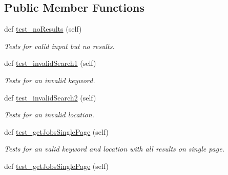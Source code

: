 \subsection*{Public Member Functions}
\begin{DoxyCompactItemize}
\item 
\mbox{\label{classtest_1_1indeedTest_a3d5826de5f0ba8570e2f9f8b31fd9a5a}} 
def \hyperlink{classtest_1_1indeedTest_a3d5826de5f0ba8570e2f9f8b31fd9a5a}{test\+\_\+no\+Results} (self)
\begin{DoxyCompactList}\small\item\em Tests for valid input but no results. \end{DoxyCompactList}\item 
\mbox{\label{classtest_1_1indeedTest_a42a1ea2430b1d5cd9d11a42a0ace4694}} 
def \hyperlink{classtest_1_1indeedTest_a42a1ea2430b1d5cd9d11a42a0ace4694}{test\+\_\+invalid\+Search1} (self)
\begin{DoxyCompactList}\small\item\em Tests for an invalid keyword. \end{DoxyCompactList}\item 
\mbox{\label{classtest_1_1indeedTest_a2a46d2ed5587c9449af6d2c5e81ba804}} 
def \hyperlink{classtest_1_1indeedTest_a2a46d2ed5587c9449af6d2c5e81ba804}{test\+\_\+invalid\+Search2} (self)
\begin{DoxyCompactList}\small\item\em Tests for an invalid location. \end{DoxyCompactList}\item 
\mbox{\label{classtest_1_1indeedTest_af6c8603a8b8812426cd915e4a14e1ad3}} 
def \hyperlink{classtest_1_1indeedTest_af6c8603a8b8812426cd915e4a14e1ad3}{test\+\_\+get\+Jobs\+Single\+Page} (self)
\begin{DoxyCompactList}\small\item\em Tests for an valid keyword and location with all results on single page. \end{DoxyCompactList}\item 
\mbox{\label{classtest_1_1indeedTest_af6c8603a8b8812426cd915e4a14e1ad3}} 
def \hyperlink{classtest_1_1indeedTest_af6c8603a8b8812426cd915e4a14e1ad3}{test\+\_\+get\+Jobs\+Single\+Page} (self)

\end{DoxyCompactItemize}
